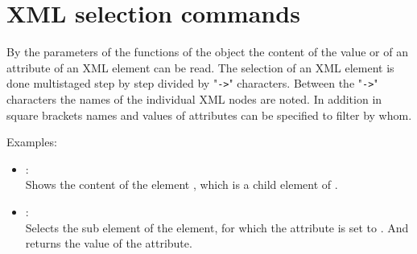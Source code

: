 \chapter{XML selection commands}

By the parameters of the functions of the  object the content of the
value or of an attribute of an XML element can be read.
The selection of an XML element is done multistaged step by step divided by
"\texttt{->}" characters. Between the "\texttt{->}" characters the names of the individual XML nodes are
noted. In addition in square brackets names and values of attributes can be specified to filter by whom.

Examples:

\begin{itemize}

\item
{}:\\
Shows the content of the element , which is a child element of .

\item
{}:\\
Selects the  sub element of the  element, for
which the  attribute is set to . And returns the value of the
 attribute.

\end{itemize}
